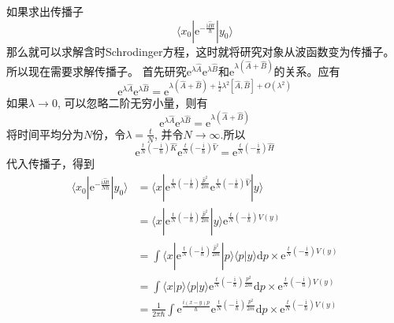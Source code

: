         如果求出传播子
        \begin{equation}
            \langle x_0 | \mathrm{e}^{-\frac {\mathrm{i}\hat{H}t}{\hbar}} | y_0 \rangle
        \end{equation}
        那么就可以求解含时Schrodinger方程，这时就将研究对象从波函数变为传播子。所以现在需要求解传播子。
        首先研究$\mathrm{e}^{\lambda \hat{A}}\mathrm{e}^{\lambda \hat{B}}$和$\mathrm{e}^{\lambda (\hat{A}+\hat{B})}$的关系。应有
        \begin{equation}
            \mathrm{e}^{\lambda \hat{A}} \mathrm{e}^{\lambda \hat{B}} = \mathrm{e}^{\lambda (\hat{A}+\hat{B}) + \frac 12 \lambda^2 [\hat{A},\hat{B}] + O(\lambda^2)}
        \end{equation}
        如果$\lambda \to 0$, 可以忽略二阶无穷小量，则有
        \begin{equation}
            \mathrm{e}^{\lambda \hat{A}} \mathrm{e}^{\lambda \hat{B}} = \mathrm{e}^{\lambda (\hat{A}+\hat{B})}
        \end{equation}
        将时间平均分为$N$份，令$\lambda = \frac tN$, 并令$N \to \infty$.所以
        \begin{equation}
            \mathrm{e}^{\frac tN (-\frac {\mathrm{i}}{\hbar}) \hat{K}} \mathrm{e}^{\frac tN (-\frac {\mathrm{i}}{\hbar}) \hat{V}} =\mathrm{e}^{\frac tN (-\frac {\mathrm{i}}{\hbar}) \hat{H}} 
        \end{equation}
        代入传播子，得到
        \begin{equation}\begin{aligned}
            \langle x_0 | \mathrm{e}^{-\frac {\mathrm{i}\hat{H}t}{N\hbar}} | y_0 \rangle &= \langle x | \mathrm{e}^{\frac tN (-\frac {\mathrm{i}}{\hbar}) \frac {\hat{p}^2}{2m}}
            \mathrm{e}^{\frac tN (-\frac {\mathrm{i}}{\hbar}) \hat{V}} |y \rangle\\
            &= \langle x | \mathrm{e}^{\frac tN (-\frac {\mathrm{i}}{\hbar}) \frac {\hat{p}^2}{2m}} |y \rangle \mathrm{e}^{\frac tN (-\frac {\mathrm{i}}{\hbar}) V(y)}\\
            &= \int \langle x | \mathrm{e}^{\frac tN (-\frac {\mathrm{i}}{\hbar}) \frac {\hat{p}^2}{2m}} |p \rangle \langle p |y \rangle \mathrm{d}p \times \mathrm{e}^{\frac tN (-\frac {\mathrm{i}}{\hbar}) V(y)}\\
            &= \int \langle x|p \rangle \langle p|y \rangle \mathrm{e}^{\frac tN (-\frac {\mathrm{i}}{\hbar}) \frac {p^2}{2m}} \mathrm{d}p \times \mathrm{e}^{\frac tN (-\frac {\mathrm{i}}{\hbar}) V(y)}\\
            &= \frac 1{2\pi \hbar} \int \mathrm{e}^{\frac {i(x-y)p}{\hbar}} \mathrm{e}^{\frac tN (-\frac {\mathrm{i}}{\hbar}) \frac {p^2}{2m}} \mathrm{d}p \times \mathrm{e}^{\frac tN (-\frac {\mathrm{i}}{\hbar}) V(y)}
        \end{aligned}\end{equation}
